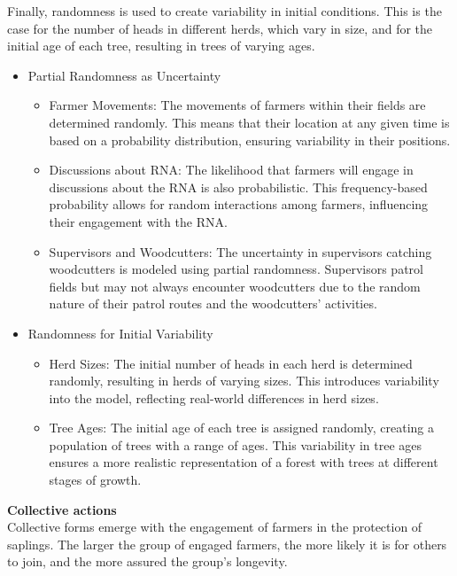 \documentclass{article}
\begin{document}
        Finally, randomness is used to create variability in initial conditions. This is the case for the number of heads in different herds, which vary in size, and for the initial age of each tree, resulting in trees of varying ages.

        \begin{itemize}
            \item Partial Randomness as Uncertainty
            \begin{itemize}
                \item Farmer Movements: The movements of farmers within their fields are determined randomly. This means that their location at any given time is based on a probability distribution, ensuring variability in their positions.
                \item Discussions about RNA: The likelihood that farmers will engage in discussions about the RNA is also probabilistic. This frequency-based probability allows for random interactions among farmers, influencing their engagement with the RNA.
                \item Supervisors and Woodcutters: The uncertainty in supervisors catching woodcutters is modeled using partial randomness. Supervisors patrol fields but may not always encounter woodcutters due to the random nature of their patrol routes and the woodcutters' activities.
            \end{itemize}

            \item Randomness for Initial Variability
            \begin{itemize}
                \item Herd Sizes: The initial number of heads in each herd is determined randomly, resulting in herds of varying sizes. This introduces variability into the model, reflecting real-world differences in herd sizes.
                \item Tree Ages: The initial age of each tree is assigned randomly, creating a population of trees with a range of ages. This variability in tree ages ensures a more realistic representation of a forest with trees at different stages of growth.\\
            \end{itemize}
        \end{itemize}

        \textbf{Collective actions}\\

        Collective forms emerge with the engagement of farmers in the protection of saplings. The larger the group of engaged farmers, the more likely it is for others to join, and the more assured the group's longevity.
\end{document}
